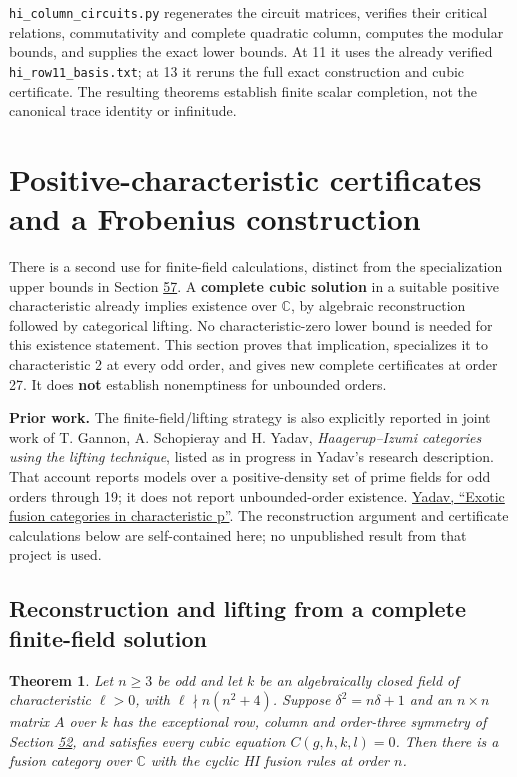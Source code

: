 \documentclass[11pt,reqno]{amsart}
\theoremstyle{plain}
\newtheorem{theorem}{Theorem}[section]
\begin{document}
\texttt{hi\_\allowbreak column\_\allowbreak circuits.py} regenerates the circuit matrices, verifies
their critical relations, commutativity and complete quadratic column,
computes the modular bounds, and supplies the exact lower bounds.
At 11 it uses the already verified \texttt{hi\_\allowbreak row11\_\allowbreak basis.txt}; at 13 it reruns
the full exact construction and cubic certificate. The resulting
theorems establish finite scalar completion, not the canonical trace
identity or infinitude.

\section{Positive-characteristic certificates and a Frobenius construction}\label{sec:58}

There is a second use for finite-field calculations, distinct from the
specialization upper bounds in Section \hyperref[sec:57]{57}. A \textbf{complete cubic solution}
in a suitable positive characteristic already implies existence over
\(\mathbb C\), by algebraic reconstruction followed by categorical lifting.
No characteristic-zero lower bound is needed for this existence statement.
This section proves that implication, specializes it to characteristic 2
at every odd order, and gives new complete certificates at order 27.
It does \textbf{not} establish nonemptiness for unbounded orders.

\textbf{Prior work.} The finite-field/lifting strategy is also explicitly
reported in joint work of T. Gannon, A. Schopieray and H. Yadav,
\emph{Haagerup--Izumi categories using the lifting technique}, listed as
in progress in Yadav's research description. That account reports
models over a positive-density set of prime fields for odd orders
through 19; it does not report unbounded-order existence.
\href{https://sites.ualberta.ca/~hyadav3/research-description.html}{Yadav, ``Exotic fusion categories in characteristic p''}.
The reconstruction argument and certificate calculations below are
self-contained here; no unpublished result from that project is used.

\subsection{Reconstruction and lifting from a complete finite-field solution}\label{sec:58.1}

\begin{theorem}
Let \(n\ge3\) be odd and let \(k\) be an algebraically
closed field of characteristic \(\ell>0\), with
\(\ell\nmid n(n^2+4)\). Suppose \(\delta^2=n\delta+1\) and an
\(n\times n\) matrix \(A\) over \(k\) has the exceptional row,
column and order-three symmetry of Section \hyperref[sec:52]{52}, and satisfies every
cubic equation \(C(g,h,k,l)=0\). Then there is a fusion category over
\(\mathbb C\) with the cyclic HI fusion rules at order \(n\).
\end{theorem}
\end{document}

